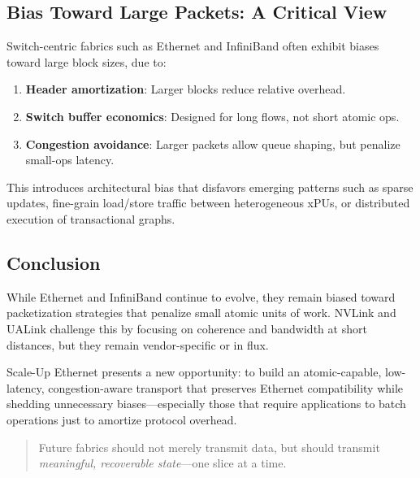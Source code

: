 \subsection{Bias Toward Large Packets: A Critical View}

Switch-centric fabrics such as Ethernet and InfiniBand often exhibit biases toward large block sizes, due to:

\begin{enumerate}
  \item \textbf{Header amortization}: Larger blocks reduce relative overhead.
  \item \textbf{Switch buffer economics}: Designed for long flows, not short atomic ops.
  \item \textbf{Congestion avoidance}: Larger packets allow queue shaping, but penalize small-ops latency.
\end{enumerate}

This introduces architectural bias that disfavors emerging patterns such as sparse updates, fine-grain load/store traffic between heterogeneous xPUs, or distributed execution of transactional graphs.

\subsection{Conclusion}

While Ethernet and InfiniBand continue to evolve, they remain biased toward packetization strategies that penalize small atomic units of work. NVLink and UALink challenge this by focusing on coherence and bandwidth at short distances, but they remain vendor-specific or in flux.

Scale-Up Ethernet presents a new opportunity: to build an atomic-capable, low-latency, congestion-aware transport that preserves Ethernet compatibility while shedding unnecessary biases—especially those that require applications to batch operations just to amortize protocol overhead.


\begin{quote}
Future fabrics should not merely transmit data, but should transmit \emph{meaningful, recoverable state}—one slice at a time.
\end{quote}

